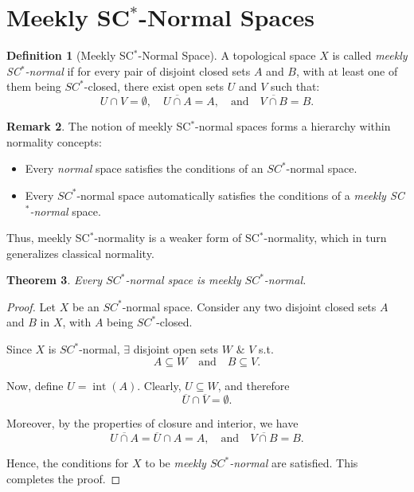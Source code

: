 \documentclass[12pt,a4paper,twoside]{report}  %
\theoremstyle{plain}
\newtheorem{theorem}{Theorem}[section]
\theoremstyle{definition}
\newtheorem{definition}[theorem]{Definition}
\newtheorem{remark}[theorem]{Remark}
\begin{document}
\section{Meekly \texorpdfstring{SC$^*$}{SC*}-Normal Spaces}


\begin{definition}[Meekly SC$^*$-Normal Space]\label{meekly SC*-normalspaces}
A topological space $X$ is called \emph{meekly SC$^*$-normal} if for every pair of disjoint closed sets $A$ and $B$, with at least one of them being $SC^*$-closed\cite{tomar2025sc}, there exist open sets $U$ and $V$ such that:
\[
U \cap V = \emptyset, \quad \overline{U \cap A} = A, \quad \text{and} \quad \overline{V \cap B} = B.
\]
\end{definition}

\begin{remark}
The notion of meekly SC$^*$-normal spaces forms a hierarchy within normality concepts:
\begin{itemize}
    \item Every \emph{normal} space satisfies the conditions of an $SC^*$-normal space.
    \item Every $SC^*$-normal space automatically satisfies the conditions of a \emph{meekly SC$^*$-normal} space.
\end{itemize}
Thus, meekly SC$^*$-normality is a weaker form of SC$^*$-normality, which in turn generalizes classical normality.
\end{remark}



\begin{theorem}\label{thm:1.5.3}
Every $SC^*$-normal space is meekly $SC^*$-normal.
\end{theorem}

\begin{proof}
Let $X$ be an $SC^*$-normal space. Consider any two disjoint closed sets $A$ and $B$ in $X$, with $A$ being $SC^*$-closed.  

Since $X$ is $SC^*$-normal, $\exists$ disjoint open sets $W$ $\&$ $V$ s.t.
\[
A \subseteq W \quad \text{and} \quad B \subseteq V.
\]

Now, define $U = \operatorname{int}(A)$. Clearly, $U \subseteq W$, and therefore
\[
\overline{U} \cap \overline{V} = \emptyset.
\]

Moreover, by the properties of closure and interior, we have
\[
\overline{U \cap A} = \overline{U} \cap A = A, \quad \text{and} \quad \overline{V \cap B} = B.
\]

Hence, the conditions for $X$ to be \emph{meekly $SC^*$-normal} are satisfied. This completes the proof.
\end{proof}
\end{document}
